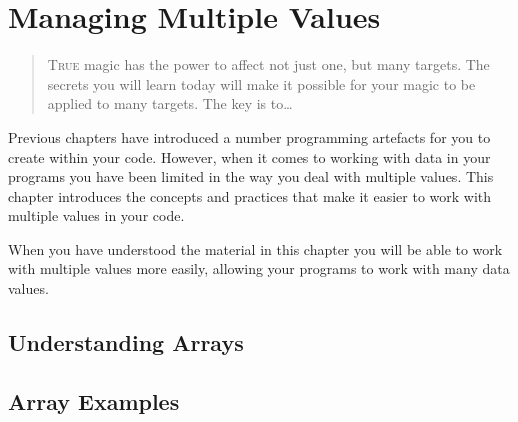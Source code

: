 \chapter{Managing Multiple Values} %
\label{cha:managing_multiple_values}

\begin{quote}
  \Fontlukas\Large
  \renewcommand{\LettrineTextFont}{\relax}
  \lettrine[image=true,lines=3,lraise=0.1]
  {T}{rue} magic has the power to affect not just one, but many targets. The secrets you will learn today will make it possible for your magic to be applied to many targets. The key is to\ldots
\end{quote}

\bigskip


Previous chapters have introduced a number programming artefacts for you to create within your code. However, when it comes to working with data in your programs you have been limited in the way you deal with multiple values. This chapter introduces the concepts and practices that make it easier to work with multiple values in your code.

When you have understood the material in this chapter you will be able to work with multiple values more easily, allowing your programs to work with many data values. 

\minitoc








\clearpage
\def\pageLang{none}
\section{Understanding Arrays} %
\label{sec:understanding_arrays}




\clearpage
\section{Array Examples} %
\label{sec:array_examples}

